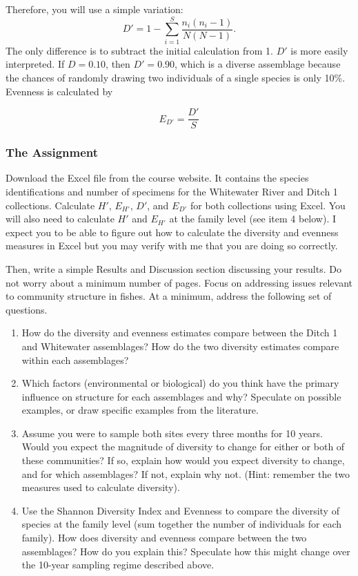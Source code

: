 \documentclass[12pt]{article}
\begin{document}
Therefore, you will use a simple variation:
\begin{equation*}
D' = 1 - \sum_{i=1}^{S} \frac{n_i(n_i-1)}{N(N-1)}.
\end{equation*}
The only difference is to subtract the initial calculation from 1. $D'$ is more easily interpreted. If $D = 0.10$, then $D' = 0.90$, which is a diverse assemblage because the chances of randomly drawing two individuals of a single species is only 10\%.  Evenness is calculated by

\begin{equation*}
E_{D'} = \frac{D'}{S}
\end{equation*}

\subsubsection*{The Assignment}

Download the Excel file from the course website. It contains the species identifications and number of specimens for the Whitewater River and Ditch 1 collections. Calculate $H'$, $E_{H'}$, $D'$, and $E_{D'}$ for both collections using Excel.  You will also need to calculate $H'$ and $E_{H'}$ at the family level (see item 4 below). I expect you to be able to figure out how to calculate the diversity and evenness measures in Excel but you may verify with me that you are doing so correctly.

Then, write a simple Results and Discussion section discussing your results.  Do not worry about a minimum number of pages.  Focus on addressing issues relevant to community structure in fishes.  At a minimum, address the following set of questions.
\begin{enumerate}
\item How do the diversity and evenness estimates compare between the Ditch 1 and Whitewater assemblages?  How do the two diversity estimates compare within each assemblages?

\item Which factors (environmental or biological) do you think have the primary influence on structure for each assemblages and why?  Speculate on possible examples, or draw specific examples from the literature.

\item Assume you were to sample both sites every three months for 10 years.  Would you expect the magnitude of diversity to change for either or both of these communities?  If so, explain how would you expect diversity to change, and for which assemblages?  If not, explain why not.  (Hint: remember the two measures used to calculate diversity).  

\item Use the Shannon Diversity Index and Evenness to compare the diversity of species at the family level (sum together the number of individuals for each family).  How does diversity and evenness compare between the two assemblages?  How do you explain this?  Speculate how this might change over the 10-year sampling regime described above.
\end{enumerate}
\end{document}
